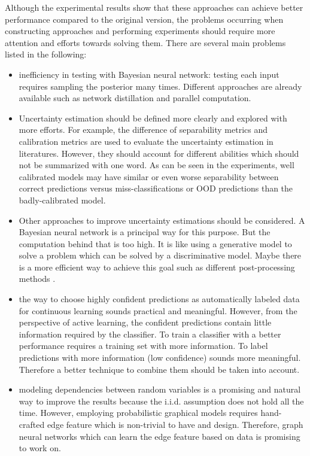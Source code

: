 Although the experimental results show that these approaches can achieve better performance compared to the original version, the problems occurring when constructing approaches and performing experiments should require more attention and efforts towards solving them. There are several main problems listed in the following:
\begin{itemize}
	\item inefficiency in testing with Bayesian neural network: testing each input requires sampling the posterior many times. Different approaches are already available such as network\cite{hinton2015distilling} distillation and parallel computation.  
	
	\item Uncertainty estimation should be defined more clearly and explored with more efforts. For example, the difference of separability metrics and calibration metrics are used to evaluate the uncertainty estimation in literatures\cite{hendrycks2016baseline}\cite{guo2017calibration}. However, they should account for different abilities which should not be summarized with one word. As can be seen in the experiments, well calibrated models may have similar or even worse separability between correct predictions versus miss-classifications or OOD predictions than the badly-calibrated model. 
	
	\item Other approaches to improve uncertainty estimations should be considered. A Bayesian neural network is a principal way for this purpose. But the computation behind that is too high. It is like using a generative model to solve a problem which can be solved by a discriminative model. Maybe there is a more efficient way to achieve this goal such as different post-processing methods \cite{guo2017calibration}. 
	
	\item the way to choose highly confident predictions as automatically labeled data for continuous learning sounds practical and meaningful. However, from the perspective of active learning, the confident predictions contain little information required by the classifier. To train a classifier with a better performance requires a training set with more information. To label predictions with more information (low confidence) sounds more meaningful. Therefore a better technique to combine them should be taken into account. 
	
	\item modeling dependencies between random variables is a promising and natural way to improve the results because the i.i.d. assumption does not hold all the time. However, employing probabilistic graphical models requires hand-crafted edge feature which is non-trivial to have and design. Therefore, graph neural networks which can learn the edge feature based on data is promising to work on.
\end{itemize} 

